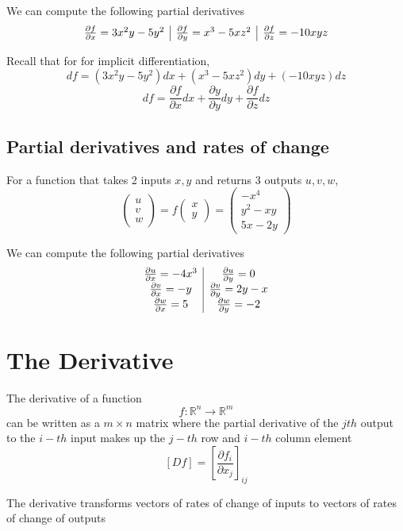 We can compute the following partial derivatives
\[
\begin{array}{c |c  |c}
   \frac{\partial f}{\partial x} = 3x^2 y - 5y^2 &
   \frac{\partial f}{\partial y} = x^3 - 5 x z^2 &
   \frac{\partial f}{\partial z} = -10xyz 
\end{array}
\] 

Recall that for for implicit differentiation,
\[
  df = (3x^2y - 5y^2) dx + (x^3 - 5xz^2) dy + (-10xyz) dz 
\] 
\[
  df = \frac{\partial f}{\partial x} dx + \frac{\partial y}{\partial y} dy + \frac{\partial f}{\partial z} dz
\] 

\subsection{Partial derivatives and rates of change}

For a function that takes 2 inputs $x, y$ and returns 3 outputs $u, v, w$, 
\[
  \begin{pmatrix} u \\v \\ w \end{pmatrix}  = f \begin{pmatrix} x \\ y  \end{pmatrix} = \begin{pmatrix}
    -x^4 \\
    y^2 - xy \\
    5x - 2y
  \end{pmatrix}
\] 

We can compute the following partial derivatives 
\[
   \begin{array}{c | c}
      \frac{\partial u}{ \partial x} = -4x^3 & 
      \frac{\partial u}{ \partial y} = 0 \\
      \frac{\partial v}{ \partial x} = -y & 
      \frac{\partial v}{ \partial y} = 2y-x \\
      \frac{\partial w}{ \partial x} = 5& 
      \frac{\partial w}{ \partial y} = -2 \\
   \end{array}
\] 


\section{The Derivative}

\begin{framed}
   The derivative of a function \[
     f: \mathbb{R}^n \to \mathbb{R}^m
   \]  can be written as a $m \times n$ matrix where the partial derivative of the $j th$ output to the $ i -th$ input makes up the $j-th$ row and $i-th$ column element \[
   [Df] = \left[ \frac{\partial f_i}{ \partial x_j}\right]_{ij}
   \] 

   The derivative transforms vectors of rates of change of inputs to vectors of rates of change of outputs
\end{framed}

